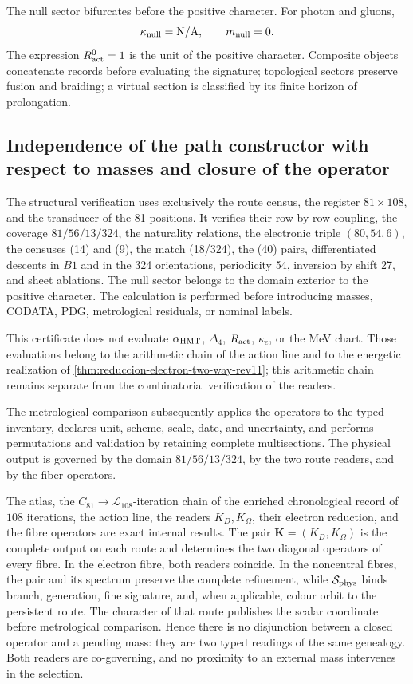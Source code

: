 The null sector bifurcates before the positive character. For photon and gluons,
\[
 \kappa_{\rm null}=\mathrm{N/A},
 \qquad m_{\rm null}=0.
\]
The expression \(R_{\rm act}^{0}=1\) is the unit of the positive character. Composite objects
concatenate records before evaluating the signature; topological sectors preserve fusion and
braiding; a virtual section is classified by its finite horizon of
prolongation.

\subsection{Independence of the path constructor with respect to masses and closure of the operator}

The structural verification uses exclusively the route census, the
register \(81\times108\), and the transducer of the 81 positions. It verifies their
row-by-row coupling, the coverage
\(81/56/13/324\), the naturality relations, the electronic triple \((80,54,6)\), the
censuses (14) and (9), the match (18/324), the
(40) pairs, differentiated descents in \(B1\) and in the 324 orientations,
periodicity 54, inversion by shift 27, and sheet ablations. The
null sector belongs to the domain exterior to the positive character. The calculation is
performed before introducing masses, CODATA, PDG, metrological residuals, or
nominal labels.

This certificate does not evaluate \(\alpha_{\rm HMT}\), \(\Delta_4\),
\(R_{\rm act}\), \(\kappa_e\), or the MeV chart. Those evaluations belong to
the arithmetic chain of the action line and to the energetic realization of
\cref{thm:reduccion-electron-two-way-rev11}; this arithmetic chain remains
separate from the combinatorial verification of the readers.

The metrological comparison subsequently applies the operators to the typed inventory,
declares unit, scheme, scale, date, and uncertainty, and performs permutations
and validation by retaining complete multisections. The physical output is
governed by the domain \(81/56/13/324\), by the two route readers, and by
the fiber operators.

\begin{statusbox}[title={Exact domain and closed physical realization}]
The atlas, the \(C_{81}\to\mathcal L_{108}\)-iteration chain of the
enriched chronological record of \(108\) iterations,
the action line,
the readers \(K_D,K_\Omega\), their electron reduction, and the fibre
operators are exact internal results. The pair
\(\mathbf K=(K_D,K_\Omega)\) is the complete output on each route and
determines the two diagonal operators of every fibre. In the electron
fibre, both readers coincide. In the noncentral fibres, the pair and its
spectrum preserve the complete refinement, while
\(\mathcal S_{\rm phys}\) binds branch, generation, fine signature, and, when
applicable, colour orbit to the persistent route. The character of that route
publishes the scalar coordinate before metrological comparison. Hence there is no
disjunction between a closed operator and a pending mass: they are two typed
readings of the same genealogy. Both readers are co-governing, and no
proximity to an external mass intervenes in the selection.
\end{statusbox}
